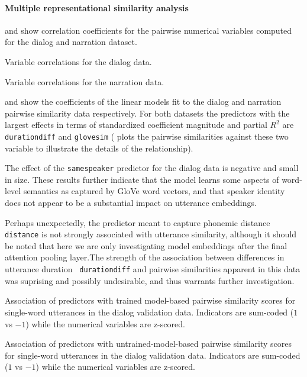  
\paragraph{Multiple representational similarity analysis}

 and 
show correlation coefficients for the pairwise numerical variables
computed for the  dialog and narration dataset. 


\begin{table}
  \centering

\caption{Variable correlations for the dialog data.}
  \label{tab:dialog-cor}
\end{table}
\begin{table}
  \centering

\caption{Variable correlations for the narration data.}
  \label{tab:narration-cor}
\end{table}


 and  show the coefficients
of the linear models fit to the dialog and narration pairwise
similarity data respectively. For both datasets the predictors with
the largest effects in terms of standardized coefficient magnitude and
partial $R^2$ are {\tt durationdiff} and {\tt glovesim}
( plots the pairwise similarities
against these two variable to illustrate the details of the
relationship).
 
The effect of
the {\tt samespeaker} predictor for the dialog data is negative and
small in size.  These results further indicate that the model learns
some aspects of word-level semantics as captured by GloVe word
vectors, and that speaker identity does not appear to be a substantial
impact on utterance embeddings.

Perhaps unexpectedly, the predictor meant to capture phonemic distance
{\tt distance} is not strongly associated with utterance similarity,
although it should be noted that here we are only investigating model
embeddings after the final attention pooling layer.The strength of
the association between differences in utterance duration {\tt
  durationdiff} and pairwise similarities apparent in this data was
suprising and possibly undesirable, and thus warrants further investigation.



\begin{table}
  \centering

\caption{Association of predictors with trained model-based pairwise
  similarity scores for single-word utterances in the dialog
  validation data. Indicators are sum-coded ($1$ vs $-1$) while the
  numerical variables are z-scored.}
\label{tab:dialog-lm}
\end{table}
\begin{table}
  \centering

\caption{Association of predictors with untrained-model-based pairwise
  similarity scores for single-word utterances in the dialog
  validation data. Indicators are sum-coded ($1$ vs $-1$) while the
  numerical variables are z-scored.}
\label{tab:dialog-lm_init}
\end{table}

